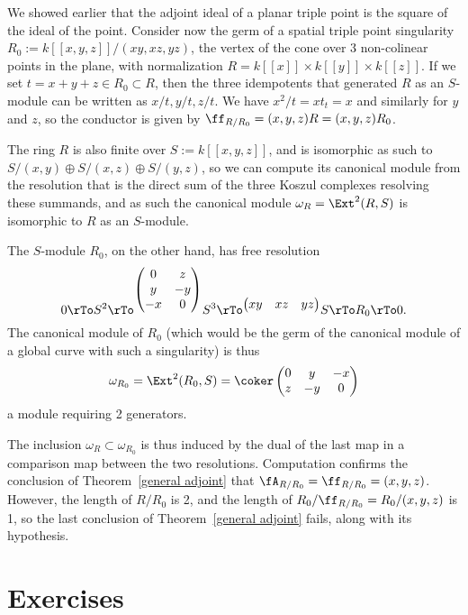 \begin{example}\label{nongorenstein}
We showed earlier that the adjoint ideal of a planar triple point is the square of the ideal of the point. Consider now
  the germ of a spatial triple point singularity $R_0 := k[[x,y,z]]/(xy, xz,yz)$, the vertex of the cone over 3
 non-colinear points in the plane, with normalization $R = k[[x]]\times k[[y]]\times k[[z]]$.
 If we set $t = x+y+z\in R_0\subset R$, then the three idempotents that generated $R$ as an $S$-module
 can be written as $x/t, y/t, z/t$. We have $x^2/t = xt_t= x$ and similarly for $y$ and $z$, so
 the conductor is given by $\ff_{R/R_0} = (x,y,z)R = (x,y,z)R_0$.
 
 The ring $R$ is also finite over $S := k[[x,y,z]]$, and is isomorphic as such to 
 $S/(x,y)\oplus S/(x,z) \oplus S/(y,z)$, so we can compute its canonical module from the
 resolution that is the direct sum of the three Koszul complexes resolving these summands, and 
 as such the canonical module $\omega_R = \Ext^2(R,S)$ is isomorphic to $R$ as an $S$-module.
 

 The $S$-module $R_0$, on the other hand,   has free resolution
 $$
 0\rTo S^2\rTo^{
	\begin{pmatrix}
 0&z\\
 y&-y\\
 -x&0
\end{pmatrix}}
 S^3 \rTo^{
\begin{pmatrix}
 xy&xz&yz
\end{pmatrix}}
 S \rTo R_0 \rTo 0. 
 $$
The canonical module of $R_0$ (which would be the germ of the canonical module of a global curve with such a singularity) is thus 
 $$
 \omega_{R_0} = \Ext^2(R_0, S) = 
 \coker 
\begin{pmatrix}
 0&y&-x\\z&-y&0
\end{pmatrix}
$$
a module requiring 2 generators.
\end{example}
The inclusion $\omega_{R} \subset \omega_{R_0}$ is thus induced by the 
dual of the last map in a comparison map between the two resolutions. Computation
confirms the conclusion of Theorem~\ref{general adjoint} that $\fA_{R/R_0} = \ff_{R/R_0} = (x,y,z)$. However, the length of $R/R_0$ is 2, and the length of $R_0/\ff_{R/R_0} = R_0/(x,y,z)$ is  1, so the
last conclusion of Theorem~\ref{general adjoint} fails, along with its hypothesis.

\section{Exercises}

